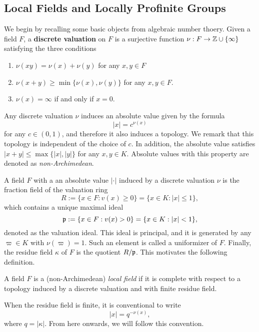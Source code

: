 \subsection{Local Fields and Locally Profinite Groups}
We begin by recalling some basic objects from algebraic number thoery. Given a field $F$, a \textbf{discrete valuation} on $F$ is a surjective function $\nu: F\to\mathbb{Z}\cup\{\infty\}$ satisfying the three conditions

\begin{enumerate}
    \item $\nu(xy)=\nu(x)+\nu(y)$ for any $x,y\in F$ 
    \item $\nu(x+y)\geq\min\{\nu(x),\nu(y)\}$ for any $x,y\in F$.
    \item $\nu(x)=\infty$ if and only if $x=0$.
\end{enumerate}

Any discrete valuation $\nu$ induces an absolute value given by the formula 
$$|x|=c^{\nu(x)}$$ 
for any $c\in(0,1)$, and therefore it also induces a topology. We remark that this topology is independent of the choice of $c$. In addition, the absolute value satisfies $|x+y|\leq\max\{|x|,|y|\}$ for any $x,y\in K$. Absolute values with this property are denoted as \textit{non-Archimedean}.

A field $F$ with a an absolute value $|\cdot|$ induced by a discrete valuation $\nu$ is the fraction field of the valuation ring
$$R:=\{x\in F:v(x)\geq 0\}=\{x\in K: |x|\leq1\},$$ 
which contains a unique maximal ideal
$$\mathfrak{p}:=\{x\in F:v(x)> 0\}=\{x\in K: |x|<1\},$$
denoted as the valuation ideal. This ideal is principal, and it is generated by any $\varpi\in K$ with $\nu(\varpi)=1$. Such an element is called a uniformizer of $F$. Finally, the residue field $\kappa$ of $F$ is the quotient $R/\mathfrak{p}$. This motivates the following definition.

\begin{defn}
    A field $F$ is a (non-Archimedean) \textit{local field} if it is complete with respect to a topology induced by a discrete valuation and with finite residue field.
\end{defn}

\begin{rem}
    When the residue field is finite, it is conventional to write 
    $$|x|=q^{-\nu(x)},$$ 
    where $q=|\kappa|$. From here onwards, we will follow this convention.
\end{rem}

